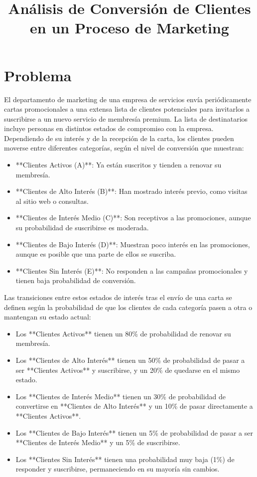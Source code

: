\documentclass{article}
\begin{document}
\title{Análisis de Conversión de Clientes en un Proceso de Marketing}
\author{}
\date{}
\maketitle

\section*{Problema}

El departamento de marketing de una empresa de servicios envía periódicamente cartas promocionales a una extensa lista de clientes potenciales para invitarlos a suscribirse a un nuevo servicio de membresía premium. La lista de destinatarios incluye personas en distintos estados de compromiso con la empresa. Dependiendo de su interés y de la recepción de la carta, los clientes pueden moverse entre diferentes categorías, según el nivel de conversión que muestran:

\begin{itemize}
    \item **Clientes Activos (A)**: Ya están suscritos y tienden a renovar su membresía.
    \item **Clientes de Alto Interés (B)**: Han mostrado interés previo, como visitas al sitio web o consultas.
    \item **Clientes de Interés Medio (C)**: Son receptivos a las promociones, aunque su probabilidad de suscribirse es moderada.
    \item **Clientes de Bajo Interés (D)**: Muestran poco interés en las promociones, aunque es posible que una parte de ellos se suscriba.
    \item **Clientes Sin Interés (E)**: No responden a las campañas promocionales y tienen baja probabilidad de conversión.
\end{itemize}

Las transiciones entre estos estados de interés tras el envío de una carta se definen según la probabilidad de que los clientes de cada categoría pasen a otra o mantengan su estado actual:

\begin{itemize}
    \item Los **Clientes Activos** tienen un 80\% de probabilidad de renovar su membresía.
    \item Los **Clientes de Alto Interés** tienen un 50\% de probabilidad de pasar a ser **Clientes Activos** y suscribirse, y un 20\% de quedarse en el mismo estado.
    \item Los **Clientes de Interés Medio** tienen un 30\% de probabilidad de convertirse en **Clientes de Alto Interés** y un 10\% de pasar directamente a **Clientes Activos**.
    \item Los **Clientes de Bajo Interés** tienen un 5\% de probabilidad de pasar a ser **Clientes de Interés Medio** y un 5\% de suscribirse.
    \item Los **Clientes Sin Interés** tienen una probabilidad muy baja (1\%) de responder y suscribirse, permaneciendo en su mayoría sin cambios.
\end{itemize}
\end{document}
